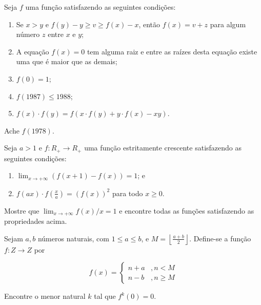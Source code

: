 \begin{questao}
  Seja $f$ uma função satisfazendo as seguintes condições:

  \begin{enumerate}

  \item Se $x>y$ e $f(y)-y \geq v \geq f(x)-x$, então $f(x)=v+z$ para algum
    número $z$ entre $x$ e $y$;

  \item A equação $f(x)=0$ tem alguma raiz e entre as raízes desta equação
    existe uma que é maior que as demais;

  \item $f(0)=1$;

  \item $f(1987) \leq 1988$;

  \item $f(x) \cdot f(y) = f(x \cdot f(y) + y \cdot f(x) -xy)$.
  \end{enumerate}


  Ache $f(1978)$.
\end{questao}

\begin{questao}
  Seja $a > 1$ e $f:R_{+} \rightarrow R_{+}$ uma função estritamente crescente
  satisfazendo as seguintes condições:

  \begin{enumerate}

  \item $\lim_{x \rightarrow +\infty}{(f(x+1)-f(x))} = 1$; e

  \item $f(ax) \cdot f \left( \frac{x}{a} \right) = (f(x))^2$ para todo $x \geq
    0$.
  \end{enumerate}

  Mostre que $\lim_{x \rightarrow +\infty}{f(x)/x} = 1$ e encontre todas as
  funções satisfazendo as propriedades acima.
\end{questao}

\begin{questao}
  Sejam $a,b$ números naturais, com $1 \leq a \leq b$, e $M = \left \lfloor
  \frac{a+b}{2} \right \rfloor$. Define-se a função $f: Z \rightarrow Z$ por

  $$ f(x) = \left\{
  \begin{split}
    n+a &, n < M\\ n-b &, n \geq M
  \end{split}
  \right. $$

  Encontre o menor natural $k$ tal que $f^k(0)=0$.
\end{questao}

